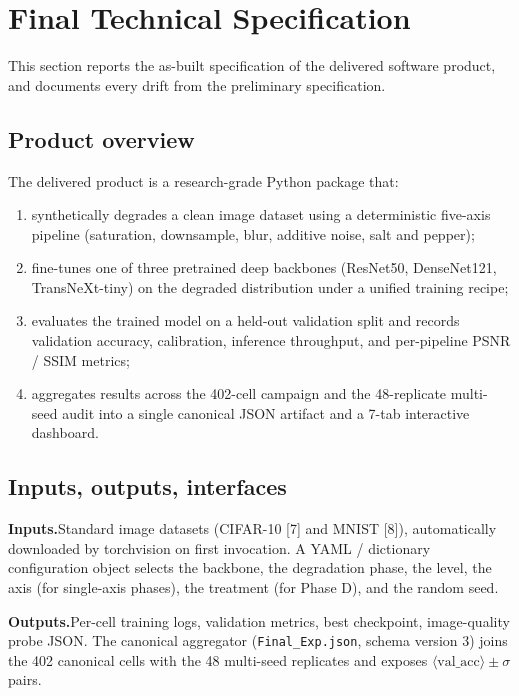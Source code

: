 \section{Final Technical Specification}
\label{sec:spec}

This section reports the as-built specification of the delivered software
product, and documents every drift from the preliminary specification.

\subsection{Product overview}
The delivered product is a research-grade Python package that:
\begin{enumerate}
  \item synthetically degrades a clean image dataset using a deterministic
        five-axis pipeline (saturation, downsample, blur, additive noise,
        salt and pepper);
  \item fine-tunes one of three pretrained deep backbones (ResNet50,
        DenseNet121, TransNeXt-tiny) on the degraded distribution under a
        unified training recipe;
  \item evaluates the trained model on a held-out validation split and
        records validation accuracy, calibration, inference throughput, and
        per-pipeline PSNR / SSIM metrics;
  \item aggregates results across the 402-cell campaign and the 48-replicate
        multi-seed audit into a single canonical JSON artifact and a 7-tab
        interactive dashboard.
\end{enumerate}

\subsection{Inputs, outputs, interfaces}
\textbf{Inputs.}\quad Standard image datasets (CIFAR-10 [7]
and MNIST [8]), automatically downloaded by torchvision on
first invocation. A YAML / dictionary configuration object selects the
backbone, the degradation phase, the level, the axis (for single-axis
phases), the treatment (for Phase D), and the random seed.

\textbf{Outputs.}\quad Per-cell training logs, validation metrics, best
checkpoint, image-quality probe JSON. The canonical aggregator
(\texttt{Final\_Exp.json}, schema version 3) joins the 402 canonical cells
with the 48 multi-seed replicates and exposes
$\langle\mathrm{val\_acc}\rangle \pm \sigma$ pairs.

